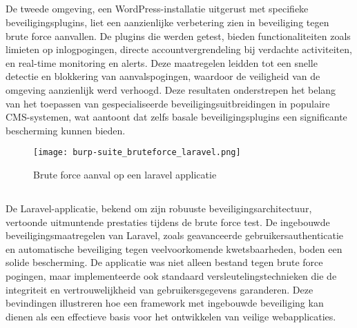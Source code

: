 \subsection{}
De tweede omgeving, een WordPress-installatie uitgerust met specifieke beveiligingsplugins, liet een aanzienlijke verbetering zien in beveiliging 
tegen brute force aanvallen. De plugins die werden getest, bieden functionaliteiten zoals limieten op inlogpogingen, directe accountvergrendeling 
bij verdachte activiteiten, en real-time monitoring en alerts. Deze maatregelen leidden tot een snelle detectie en blokkering van aanvalspogingen, 
waardoor de veiligheid van de omgeving aanzienlijk werd verhoogd. Deze resultaten onderstrepen het belang van het toepassen van gespecialiseerde 
beveiligingsuitbreidingen in populaire CMS-systemen, wat aantoont dat zelfs basale beveiligingsplugins een significante bescherming kunnen bieden.

\begin{figure}
    \centering
    \texttt{[image: burp-suite\_bruteforce\_laravel.png]}
    \caption[Brute force aanval op een laravel applicatie]{Brute force aanval op een laravel applicatie}
\end{figure}
\subsection{}
De Laravel-applicatie, bekend om zijn robuuste beveiligingsarchitectuur, vertoonde uitmuntende prestaties tijdens de brute force test. De 
ingebouwde beveiligingsmaatregelen van Laravel, zoals geavanceerde gebruikersauthenticatie en automatische beveiliging tegen veelvoorkomende 
kwetsbaarheden, boden een solide bescherming. De applicatie was niet alleen bestand tegen brute force pogingen, maar implementeerde ook 
standaard versleutelingstechnieken die de integriteit en vertrouwelijkheid van gebruikersgegevens garanderen. Deze bevindingen illustreren 
hoe een framework met ingebouwde beveiliging kan dienen als een effectieve basis voor het ontwikkelen van veilige webapplicaties.
